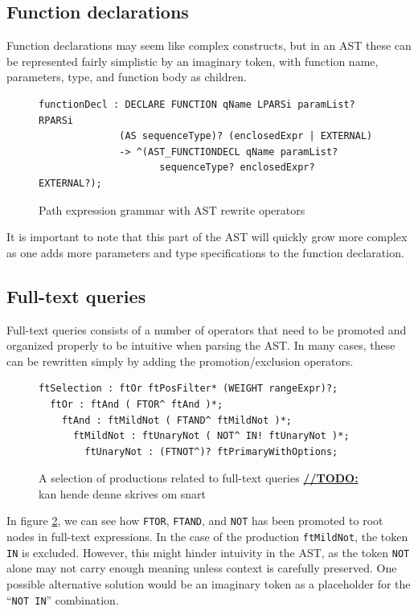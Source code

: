 \subsection{Function declarations}
Function declarations may seem like complex constructs, but in an AST these can
be represented fairly simplistic by an imaginary token, with function name, 
parameters, type, and function body as children.

\begin{figure}[h!]
\begin{verbatim} 
functionDecl : DECLARE FUNCTION qName LPARSi paramList? RPARSi 
              (AS sequenceType)? (enclosedExpr | EXTERNAL)
              -> ^(AST_FUNCTIONDECL qName paramList? 
                     sequenceType? enclosedExpr? EXTERNAL?);
\end{verbatim}
\caption{Path expression grammar with AST rewrite operators}
\label{code:ast:funcdecl1}
\end{figure}

It is important to note that this part of the AST will quickly grow more complex
as one adds more parameters and type specifications to the function declaration.

\subsection{Full-text queries}
Full-text queries consists of a number of operators that need to be promoted and
organized properly to be intuitive when parsing the AST. In many cases, these
can be rewritten simply by adding the promotion/exclusion operators. 

\begin{figure}[h!]
\begin{verbatim} 
ftSelection : ftOr ftPosFilter* (WEIGHT rangeExpr)?;
  ftOr : ftAnd ( FTOR^ ftAnd )*;
    ftAnd : ftMildNot ( FTAND^ ftMildNot )*;
      ftMildNot : ftUnaryNot ( NOT^ IN! ftUnaryNot )*;
        ftUnaryNot : (FTNOT^)? ftPrimaryWithOptions;
\end{verbatim}
\caption{A selection of productions related to full-text queries \underline{\textbf{\LARGE //TODO:}} kan hende denne skrives om snart}
\label{code:ast:ft_op}
\end{figure}

In figure \ref{code:ast:ft_op}, we can see how \verb!FTOR!, \verb!FTAND!, and \verb!NOT! 
has been promoted to root nodes in full-text expressions. In the case of the
production \verb!ftMildNot!, the token \verb!IN! is excluded. However, this
might hinder intuivity in the AST, as the token \verb!NOT! alone may not carry
enough meaning unless context is carefully preserved. One possible alternative
solution would be an imaginary token as a placeholder for the ``\verb!NOT IN!''
combination. 
